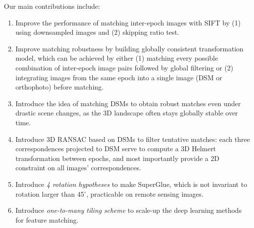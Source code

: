 Our main contributions include:\\
\begin{enumerate}
	\item Improve the performance of matching inter-epoch images with SIFT by (1) using downsampled images and (2) skipping ratio test.
	\item Improve matching robustness by building globally consistent transformation model, which can be achieved by either (1) matching every possible combination of inter-epoch image pairs followed by global filtering or (2) integrating images from the same epoch into a single image (DSM or orthophoto) before matching.
	\item Introduce the idea of matching DSMs to obtain robust matches even under drastic scene changes, as the 3D landscape often stays globally stable over time.
	\item Introduce 3D RANSAC based on DSMs to filter tentative matches: each three correspondences projected to DSM serve to compute a 3D Helmert transformation between epochs, and most importantly provide a 2D constraint on all images’ correspondences.
	\item Introduce \textit{4 rotation hypotheses} to make SuperGlue, which is not invariant to rotation larger than 45$^\circ$, practicable on remote sensing images.
	\item Introduce \textit{one-to-many tiling scheme} to scale-up the deep learning methods for feature matching.
\end{enumerate}



